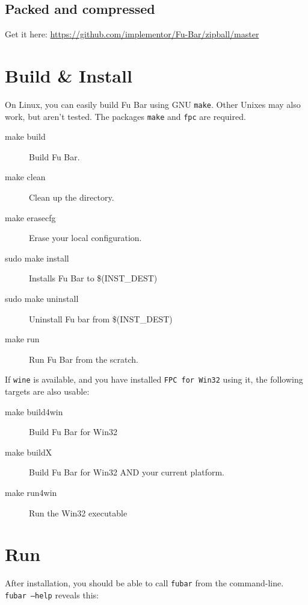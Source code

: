 \documentclass[12pt,a4paper]{article}
\begin{document}
	\subsection{Packed and compressed}
	
	Get it here: \url{https://github.com/implementor/Fu-Bar/zipball/master}
	
	\section{Build \& Install}
	
	On Linux, you can easily build Fu Bar using GNU \texttt{make}.
	Other Unixes may also work, but aren't tested.
	The packages \texttt{make} and \texttt{fpc} are required.
	
	\begin{description}
	  \item[make build] Build Fu Bar.
	  \item[make clean] Clean up the directory.
	  \item[make erasecfg] Erase your local configuration.
	  \item[sudo make install] Installs Fu Bar to \$(INST\_DEST)
	  \item[sudo make uninstall] Uninstall Fu bar from \$(INST\_DEST)
	  \item[make run] Run Fu Bar from the scratch.
	\end{description}
	
	If \texttt{wine} is available, and you have installed \texttt{FPC for
	Win32} using it, the following targets are also usable:
	
	\begin{description}
	  \item[make build4win] Build Fu Bar for Win32
	  \item[make buildX] Build Fu Bar for Win32 AND your current platform.
	  \item[make run4win] Run the Win32 executable
	\end{description}
	
	\section{Run}
	
	After installation, you should be able to call \texttt{fubar} from
	the command-line.\\
	\texttt{fubar --help} reveals this:
	
\end{document}
